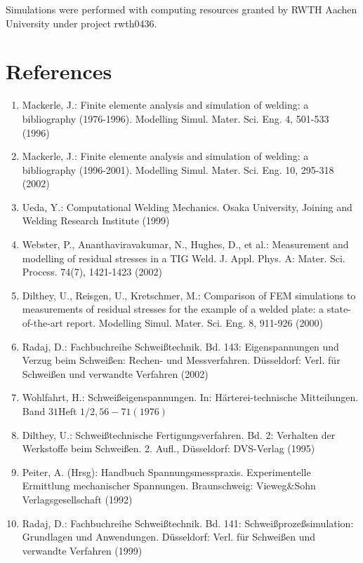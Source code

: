 \documentclass[10pt]{article}
\begin{document}
Simulations were performed with computing resources granted by RWTH Aachen University under project rwth0436.

\section*{References}
\begin{enumerate}
  \item Mackerle, J.: Finite elemente analysis and simulation of welding: a bibliography (1976-1996). Modelling Simul. Mater. Sci. Eng. 4, 501-533 (1996)

  \item Mackerle, J.: Finite elemente analysis and simulation of welding: a bibliography (1996-2001). Modelling Simul. Mater. Sci. Eng. 10, 295-318 (2002)

  \item Ueda, Y.: Computational Welding Mechanics. Osaka University, Joining and Welding Research Institute (1999)

  \item Webster, P., Ananthaviravakumar, N., Hughes, D., et al.: Measurement and modelling of residual stresses in a TIG Weld. J. Appl. Phys. A: Mater. Sci. Process. 74(7), 1421-1423 (2002)

  \item Dilthey, U., Reisgen, U., Kretschmer, M.: Comparison of FEM simulations to measurements of residual stresses for the example of a welded plate: a state-of-the-art report. Modelling Simul. Mater. Sci. Eng. 8, 911-926 (2000)

  \item Radaj, D.: Fachbuchreihe Schweißtechnik. Bd. 143: Eigenspannungen und Verzug beim Schweißen: Rechen- und Messverfahren. Düsseldorf: Verl. für Schweißen und verwandte Verfahren (2002)

  \item Wohlfahrt, H.: Schweißeigenspannungen. In: Härterei-technische Mitteilungen. Band $31 \mathrm{Heft}$ $1 / 2,56-71(1976)$

  \item Dilthey, U.: Schweißtechnische Fertigungsverfahren. Bd. 2: Verhalten der Werkstoffe beim Schweißen. 2. Aufl., Düsseldorf: DVS-Verlag (1995)

  \item Peiter, A. (Hrsg): Handbuch Spannungsmesspraxis. Experimentelle Ermittlung mechanischer Spannungen. Braunschweig: Vieweg\&Sohn Verlagsgesellschaft (1992)

  \item Radaj, D.: Fachbuchreihe Schweißtechnik. Bd. 141: Schweißprozeßsimulation: Grundlagen und Anwendungen. Düsseldorf: Verl. für Schweißen und verwandte Verfahren (1999)


\end{enumerate}
\end{document}
